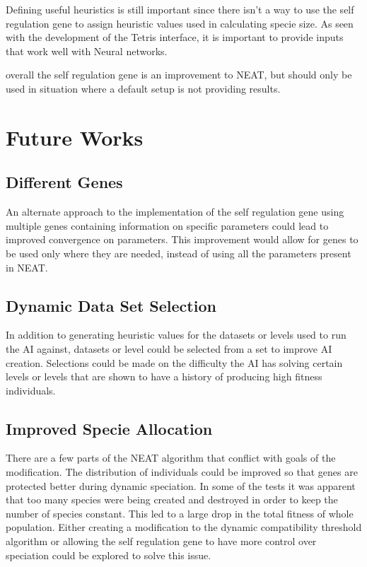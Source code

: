 \documentclass[12pt]{ucthesis} \newif\ifpdf \ifx\pdfoutput\undefined
\begin{document}
Defining useful heuristics is still important since there isn’t a way to use the
self regulation gene to assign heuristic values used in calculating specie size.
As seen with the development of the Tetris interface, it is important to provide
inputs that work well with Neural networks.

overall the self regulation gene is an improvement to NEAT, but should only be
used in situation where a default setup is not providing results.

\section{Future Works}

\subsection{Different Genes}

An alternate approach to the implementation of the self regulation gene using
multiple genes containing information on specific parameters could lead to
improved convergence on parameters. This improvement would allow for genes to be
used only where they are needed, instead of using all the parameters present in
NEAT.
\subsection{Dynamic Data Set Selection}

In addition to generating heuristic values for the datasets or levels used to
run the AI against, datasets or level could be selected from a set to improve
AI creation. Selections could be made on  the difficulty the AI has solving certain
levels or levels that are shown to have a history of producing high fitness
individuals.
\subsection{Improved Specie Allocation}

There are a few parts of the NEAT algorithm that conflict with goals of the
modification. The distribution of individuals could be improved so that genes
are protected better during dynamic speciation. In some of the tests it was
apparent that too many species were being created and destroyed in order to keep
the number of species constant. This led to a large drop in the total fitness of
whole population. Either creating a modification to the dynamic compatibility
threshold algorithm or allowing the self regulation gene to have more control
over speciation could be explored to solve this issue.
\end{document}
